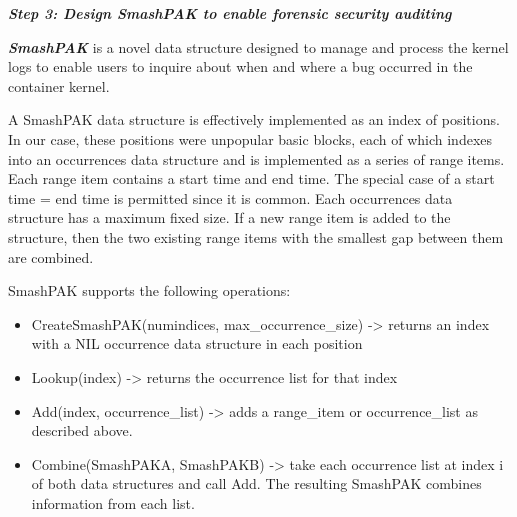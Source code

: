  
\noindent
\textit{\textbf{Step 3: Design SmashPAK to enable forensic security auditing}}

\textit{\textbf{SmashPAK}} is a novel data structure designed to manage and process the kernel logs to enable users to inquire about when and where a bug occurred in the container kernel. 

A SmashPAK data structure is effectively implemented as an index of positions. In our case, these positions were unpopular basic blocks, 
each of which indexes into an occurrences data structure and is implemented as a series of range items.  Each range item contains a start time and end time. 
The special case of a start time = end time is permitted since it is common. Each occurrences data structure has a maximum fixed size.  
If a new range item is added to the structure, then the two existing range items with the smallest gap between them are combined.  

SmashPAK supports the following operations:
\begin{itemize}
	\item CreateSmashPAK(numindices, max\_occurrence\_size) -> returns an index with a NIL occurrence data structure in each position
	\item Lookup(index) -> returns the occurrence list for that index
	\item Add(index, occurrence\_list) -> adds a range\_item or occurrence\_list as described above.
	\item Combine(SmashPAKA, SmashPAKB) -> take each occurrence list at index i of both data structures and call Add.  The resulting SmashPAK combines information from each list.
\end{itemize}

